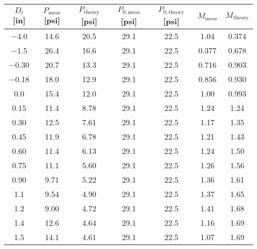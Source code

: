 \begin{tabular}{ccccccc}
\toprule
$D_t$ [\unit{in}] & $P_\text{meas}$ [\unit{psi}] & $P_\text{theory}$ [\unit{psi}] & $P_{0,\text{meas}}$ [\unit{psi}] & $P_{0,\text{theory}}$ [\unit{psi}] & $M_\text{meas}$ & $M_\text{theory}$ \\
\midrule
\num{-4.0} & \num{14.6} & \num{20.5} & \num{29.1} & \num{22.5} & \num{1.04} & \num{0.374} \\ 
\num{-1.5} & \num{26.4} & \num{16.6} & \num{29.1} & \num{22.5} & \num{0.377} & \num{0.678} \\ 
\num{-0.30} & \num{20.7} & \num{13.3} & \num{29.1} & \num{22.5} & \num{0.716} & \num{0.903} \\ 
\num{-0.18} & \num{18.0} & \num{12.9} & \num{29.1} & \num{22.5} & \num{0.856} & \num{0.930} \\ 
\num{0.0} & \num{15.4} & \num{12.0} & \num{29.1} & \num{22.5} & \num{1.00} & \num{0.993} \\ 
\num{0.15} & \num{11.4} & \num{8.78} & \num{29.1} & \num{22.5} & \num{1.24} & \num{1.24} \\ 
\num{0.30} & \num{12.5} & \num{7.61} & \num{29.1} & \num{22.5} & \num{1.17} & \num{1.35} \\ 
\num{0.45} & \num{11.9} & \num{6.78} & \num{29.1} & \num{22.5} & \num{1.21} & \num{1.43} \\ 
\num{0.60} & \num{11.4} & \num{6.13} & \num{29.1} & \num{22.5} & \num{1.24} & \num{1.50} \\ 
\num{0.75} & \num{11.1} & \num{5.60} & \num{29.1} & \num{22.5} & \num{1.26} & \num{1.56} \\ 
\num{0.90} & \num{9.71} & \num{5.22} & \num{29.1} & \num{22.5} & \num{1.36} & \num{1.61} \\ 
\num{1.1} & \num{9.54} & \num{4.90} & \num{29.1} & \num{22.5} & \num{1.37} & \num{1.65} \\ 
\num{1.2} & \num{9.00} & \num{4.72} & \num{29.1} & \num{22.5} & \num{1.41} & \num{1.68} \\ 
\num{1.4} & \num{12.6} & \num{4.64} & \num{29.1} & \num{22.5} & \num{1.16} & \num{1.69} \\ 
\num{1.5} & \num{14.1} & \num{4.61} & \num{29.1} & \num{22.5} & \num{1.07} & \num{1.69} \\ 
\bottomrule
\end{tabular}